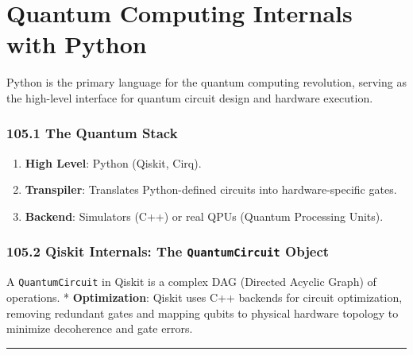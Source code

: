 \hypertarget{quantum-computing-internals-with-python}{%
\chapter{Quantum Computing Internals with
Python}\label{quantum-computing-internals-with-python}}

Python is the primary language for the quantum computing revolution,
serving as the high-level interface for quantum circuit design and
hardware execution.

\hypertarget{the-quantum-stack}{%
\subsection{105.1 The Quantum Stack}\label{the-quantum-stack}}

\begin{enumerate}
\def\labelenumi{\arabic{enumi}.}
\tightlist
\item
  \textbf{High Level}: Python (Qiskit, Cirq).
\item
  \textbf{Transpiler}: Translates Python-defined circuits into
  hardware-specific gates.
\item
  \textbf{Backend}: Simulators (C++) or real QPUs (Quantum Processing
  Units).
\end{enumerate}

\hypertarget{qiskit-internals-the-quantumcircuit-object}{%
\subsection{\texorpdfstring{105.2 Qiskit Internals: The
\texttt{QuantumCircuit}
Object}{105.2 Qiskit Internals: The QuantumCircuit Object}}\label{qiskit-internals-the-quantumcircuit-object}}

A \passthrough{\lstinline!QuantumCircuit!} in Qiskit is a complex DAG
(Directed Acyclic Graph) of operations. * \textbf{Optimization}: Qiskit
uses C++ backends for circuit optimization, removing redundant gates and
mapping qubits to physical hardware topology to minimize decoherence and
gate errors.

\begin{center}\rule{0.5\linewidth}{0.5pt}\end{center}

